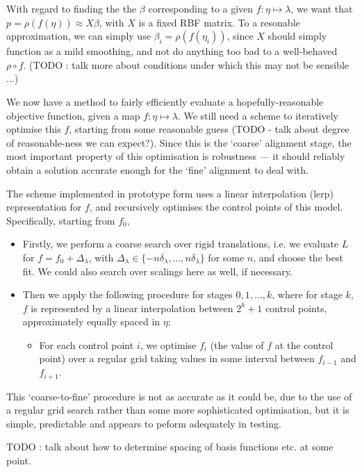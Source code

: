 With regard to finding the the $\beta$ corresponding to a given $f :
\eta \mapsto \lambda$, we want that $p = \rho (f (\eta)) \approx X
\beta$, with $X$ is a fixed RBF matrix. To a resonable approximation,
we can simply use $\beta_i= \rho (f (\eta_i))$, since $X$ should
simply function as a mild smoothing, and not do anything too bad to a
well-behaved $\rho \circ f$. (TODO : talk more about conditions under which
this may not be sensible ...)

We now have a method to fairly efficiently evaluate a hopefully-reasonable
objective function, given a map $f : \eta \mapsto \lambda$. We still need
a scheme to iteratively optimise this $f$, starting from some reasonable
guess (TODO - talk about degree of reasonable-ness we can expect?).
Since this is the `coarse' alignment stage, the most important property
of this optimisation is robustness --- it should reliably obtain a solution
accurate enough for the `fine' alignment to deal with.

The scheme implemented in prototype form uses a linear interpolation (lerp)
representation for $f$, and recursively optimises the control points of this
model. Specifically, starting from $f_0$,
\begin{itemize}
\item Firstly, we perform a coarse search over rigid translations, i.e. we evaluate
$L$ for $f = f_0 + \Delta_\lambda$, with $\Delta_\lambda \in \{-n \delta_\lambda, \dots
, n \delta_\lambda\}$ for some $n$, and choose the best fit. We could also
search over scalings here as well, if necessary.
\item Then we apply the following procedure for stages $0,1,\dots,k$,
where for stage $k$, $f$ is represented by a linear interpolation
between $2^k + 1$ control points, approximately equally spaced in
$\eta$:
\begin{itemize}
\item For each control point $i$, we optimise $f_i$ (the value of $f$ at
the control point) over a regular grid taking values in some interval between $f_{i-1}$
and $f_{i+1}$.
\end{itemize}
\end{itemize}

This `coarse-to-fine' procedure is not as accurate as it could be, due to the use
of a regular grid search rather than some more sophisticated optimisation, but it
is simple, predictable and appears to peform adequately in testing.

TODO : talk about how to determine spacing of basis functions etc. at some point.

